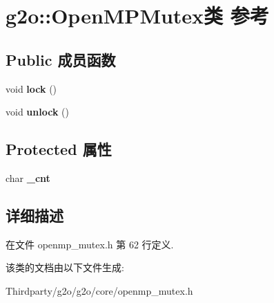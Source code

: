 \hypertarget{classg2o_1_1OpenMPMutex}{\section{g2o\-:\-:Open\-M\-P\-Mutex类 参考}
\label{classg2o_1_1OpenMPMutex}
}
\subsection*{Public 成员函数}
\begin{DoxyCompactItemize}
\item 
\hypertarget{classg2o_1_1OpenMPMutex_aa79e59ebdd67ba8c2bac379a98dc6855}{void {\bfseries lock} ()}\label{classg2o_1_1OpenMPMutex_aa79e59ebdd67ba8c2bac379a98dc6855}

\item 
\hypertarget{classg2o_1_1OpenMPMutex_a63ec384d3012af5c42fe379df2e3901a}{void {\bfseries unlock} ()}\label{classg2o_1_1OpenMPMutex_a63ec384d3012af5c42fe379df2e3901a}

\end{DoxyCompactItemize}
\subsection*{Protected 属性}
\begin{DoxyCompactItemize}
\item 
\hypertarget{classg2o_1_1OpenMPMutex_a0cb363393694ee0dd15f822fbda7645a}{char {\bfseries \-\_\-cnt}}\label{classg2o_1_1OpenMPMutex_a0cb363393694ee0dd15f822fbda7645a}

\end{DoxyCompactItemize}


\subsection{详细描述}


在文件 openmp\-\_\-mutex.\-h 第 62 行定义.



该类的文档由以下文件生成\-:\begin{DoxyCompactItemize}
\item 
Thirdparty/g2o/g2o/core/openmp\-\_\-mutex.\-h\end{DoxyCompactItemize}
